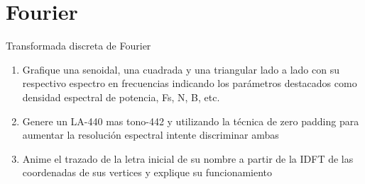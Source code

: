 \subtitle{Trabajo Practico N\textsuperscript{o} 2}
\begin{frame}[c]
\maketitle
{}
\end{frame}
 \section{Fourier}
 \begin{frame}{Transformada discreta de Fourier}
    \begin{enumerate}
       \item{Grafique una senoidal, una cuadrada y una triangular lado a lado con su respectivo espectro en frecuencias indicando los parámetros destacados como densidad espectral de potencia, Fs, N, B, etc.}
       \item{Genere un LA-440 mas tono-442 y utilizando la técnica de zero padding para aumentar la resolución espectral intente discriminar ambas}
       \item{Anime el trazado de la letra inicial de su nombre a partir de la IDFT de las coordenadas de sus vertices y explique su funcionamiento}
    \end{enumerate}
 \end{frame}
